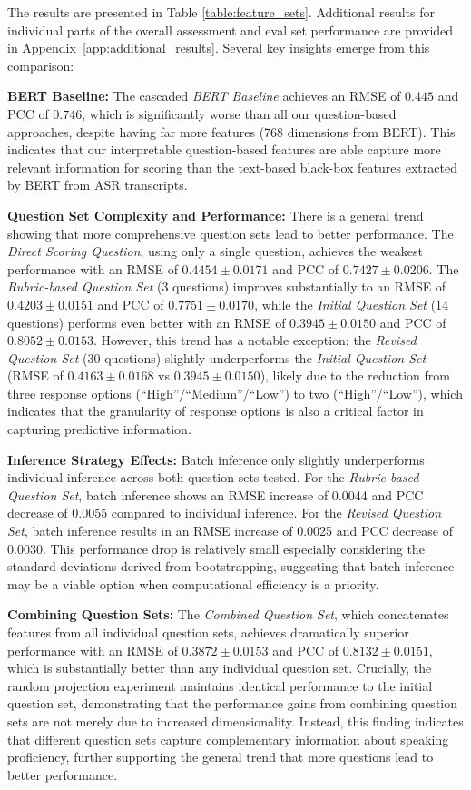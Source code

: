 \documentclass{report}
\begin{document}
The results are presented in Table \ref{table:feature_sets}. Additional results for individual parts of the overall assessment and eval set performance are provided in Appendix~\ref{app:additional_results}. Several key insights emerge from this comparison:

\textbf{BERT Baseline:} The cascaded \emph{BERT Baseline} achieves an RMSE of $0.445$ and PCC of $0.746$, which is significantly worse than all our question-based approaches, despite having far more features (768 dimensions from BERT). This indicates that our interpretable question-based features are able capture more relevant information for scoring than the text-based black-box features extracted by BERT from ASR transcripts.

\textbf{Question Set Complexity and Performance:} There is a general trend showing that more comprehensive question sets lead to better performance. The \emph{Direct Scoring Question}, using only a single question, achieves the weakest performance with an RMSE of $0.4454 \pm 0.0171$ and PCC of $0.7427 \pm 0.0206$. The \emph{Rubric-based Question Set} ($3$ questions) improves substantially to an RMSE of $0.4203 \pm 0.0151$ and PCC of $0.7751 \pm 0.0170$, while the \emph{Initial Question Set} ($14$ questions) performs even better with an RMSE of $0.3945 \pm 0.0150$ and PCC of $0.8052 \pm 0.0153$. However, this trend has a notable exception: the \emph{Revised Question Set} ($30$ questions) slightly underperforms the \emph{Initial Question Set} (RMSE of $0.4163 \pm 0.0168$ vs $0.3945 \pm 0.0150$), likely due to the reduction from three response options (``High''/``Medium''/``Low'') to two (``High''/``Low''), which indicates that the granularity of response options is also a critical factor in capturing predictive information.

\textbf{Inference Strategy Effects:} Batch inference only slightly underperforms individual inference across both question sets tested. For the \emph{Rubric-based Question Set}, batch inference shows an RMSE increase of 0.0044 and PCC decrease of 0.0055 compared to individual inference. For the \emph{Revised Question Set}, batch inference results in an RMSE increase of 0.0025 and PCC decrease of 0.0030. This performance drop is relatively small especially considering the standard deviations derived from bootstrapping, suggesting that batch inference may be a viable option when computational efficiency is a priority.

\textbf{Combining Question Sets:} The \emph{Combined Question Set}, which concatenates features from all individual question sets, achieves dramatically superior performance with an RMSE of $0.3872 \pm 0.0153$ and PCC of $0.8132 \pm 0.0151$, which is substantially better than any individual question set. Crucially, the random projection experiment maintains identical performance to the initial question set, demonstrating that the performance gains from combining question sets are not merely due to increased dimensionality. Instead, this finding indicates that different question sets capture complementary information about speaking proficiency, further supporting the general trend that more questions lead to better performance.
\end{document}
